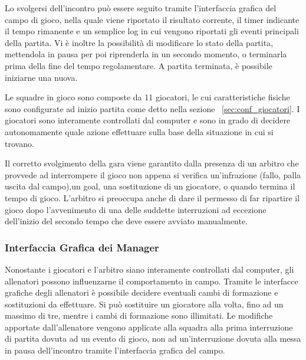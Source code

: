 Lo svolgersi dell'incontro pu\`{o} essere seguito tramite l'interfaccia grafica del campo di gioco, nella quale viene riportato il risultato corrente, il timer indicante il tempo rimanente e un semplice log in cui vengono riportati gli eventi principali della partita. Vi \`{e} inoltre la possibilit\`{a} di modificare lo stato della partita, mettendola in pausa per poi riprenderla in un secondo momento, o terminarla prima della fine del tempo regolamentare. A partita terminata, \`{e} possibile iniziarne una nuova.

Le squadre in gioco sono composte da 11 giocatori, le cui caratteristiche fisiche sono configurate ad inizio partita come detto nella sezione ~\ref{sec:conf_giocatori}. I giocatori sono interamente controllati dal computer e sono in grado di decidere autonomamente quale azione effettuare sulla base della situazione in cui si trovano.

Il corretto svolgimento della gara viene garantito dalla presenza di un arbitro che provvede ad interrompere il gioco non appena si verifica un'infrazione (fallo, palla uscita dal campo),un goal, una sostituzione di un giocatore, o quando termina il tempo di gioco. L'arbitro si preoccupa anche di dare il permesso di far ripartire il gioco dopo l'avvenimento di una delle suddette interruzioni ad eccezione dell'inizio del secondo tempo che deve essere avviato manualmente.\\

\subsubsection*{Interfaccia Grafica dei Manager}
%
\label{sec:gui_manager} 
Nonostante i giocatori e l'arbitro siano interamente controllati dal computer, gli allenatori possono influenzarne il comportamento in campo. Tramite le interfacce grafiche degli allenatori \`{e}  possibile decidere eventuali cambi di formazione e sostituzioni da effettuare. Si pu\`{o}  sostituire un giocatore alla volta, fino ad un massimo di tre, mentre i cambi di formazione sono illimitati. Le modifiche apportate dall'allenatore vengono applicate alla squadra alla prima interruzione di partita dovuta ad un evento di gioco, non ad un'interruzione dovuta alla messa in pausa dell'incontro tramite l'interfaccia grafica del campo.